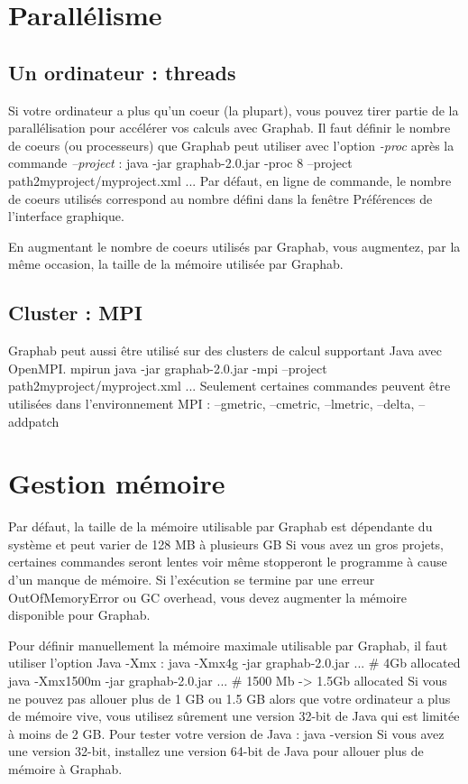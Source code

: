 \documentclass[a4paper,10pt]{report}
\newenvironment{cmd}
{\quote\Verbatim}
{\endVerbatim\endquote}
\begin{document}
\section{Parallélisme}
\subsection{Un ordinateur : threads}
Si votre ordinateur a plus qu'un coeur (la plupart), vous pouvez tirer partie de la parallélisation pour accélérer vos calculs avec Graphab.
Il faut définir le nombre de coeurs (ou processeurs) que Graphab peut utiliser avec l'option \textit{-proc} après la commande \textit{--project} :
\begin{cmd}
java -jar graphab-2.0.jar -proc 8 --project path2myproject/myproject.xml ...
\end{cmd}
Par défaut, en ligne de commande, le nombre de coeurs utilisés correspond au nombre défini dans la fenêtre Préférences de l'interface graphique.

En augmentant le nombre de coeurs utilisés par Graphab, vous augmentez, par la même occasion, la taille de la mémoire utilisée par Graphab.

\subsection{Cluster : MPI}
Graphab peut aussi être utilisé sur des clusters de calcul supportant Java avec OpenMPI.
\begin{cmd}
mpirun java -jar graphab-2.0.jar -mpi --project path2myproject/myproject.xml ...
\end{cmd}
Seulement certaines commandes peuvent être utilisées dans l'environnement MPI : --gmetric, --cmetric, --lmetric, --delta, --addpatch

\section{Gestion mémoire}
Par défaut, la taille de la mémoire utilisable par Graphab est dépendante du système et peut varier de 128 MB à plusieurs GB
Si vous avez un gros projets, certaines commandes seront lentes voir même stopperont le programme à cause d'un manque de mémoire.
Si l'exécution se termine par une erreur OutOfMemoryError ou GC overhead, vous devez augmenter la mémoire disponible pour Graphab.

Pour définir manuellement la mémoire maximale utilisable par Graphab, il faut utiliser l'option Java -Xmx :
\begin{cmd}
java -Xmx4g -jar graphab-2.0.jar ... # 4Gb allocated
java -Xmx1500m -jar graphab-2.0.jar ... # 1500 Mb -> 1.5Gb allocated
\end{cmd}
Si vous ne pouvez pas allouer plus de 1 GB ou 1.5 GB alors que votre ordinateur a plus de mémoire vive, vous utilisez sûrement une version 32-bit de Java qui est limitée à moins de 2 GB.
Pour tester votre version de Java :
\begin{cmd}
java -version
\end{cmd}
Si vous avez une version 32-bit, installez une version 64-bit de Java pour allouer plus de mémoire à Graphab.
\end{document}
